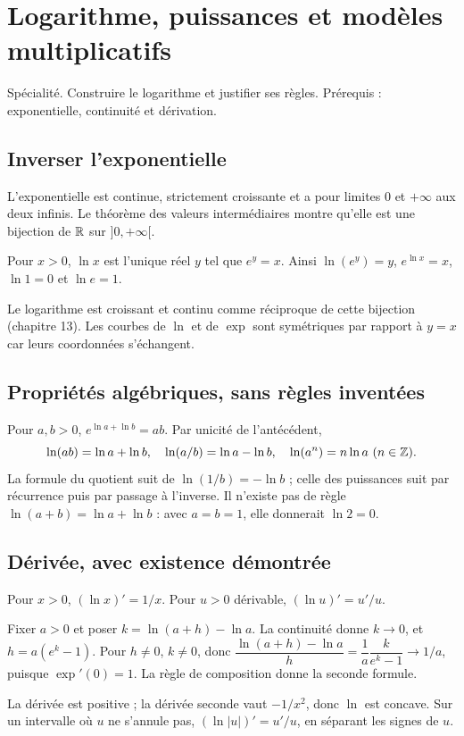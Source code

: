 \documentclass[../cours_tle.tex]{subfiles}
\begin{document}
\setcounter{chapter}{15}
\chapter{Logarithme, puissances et modèles multiplicatifs}
\label{ch:16}
\begin{objectif}
Spécialité. Construire le logarithme et justifier ses règles. Prérequis : exponentielle, continuité et dérivation.
\end{objectif}
\section{Inverser l'exponentielle}
L'exponentielle est continue, strictement croissante et a pour limites $0$ et $+\infty$ aux deux infinis. Le théorème des valeurs intermédiaires montre qu'elle est une bijection de $\mathbb{R}$ sur $]0,+\infty[$.
\begin{definition}
Pour $x>0$, $\ln x$ est l'unique réel $y$ tel que $e^y=x$.
Ainsi $\ln(e^y)=y$, $e^{\ln x}=x$, $\ln1=0$ et $\ln e=1$.
\end{definition}
Le logarithme est croissant et continu comme réciproque de cette bijection (chapitre 13). Les courbes de $\ln$ et de $\exp$ sont symétriques par rapport à $y=x$ car leurs coordonnées s'échangent.
\section{Propriétés algébriques, sans règles inventées}
Pour $a,b>0$, $e^{\ln a+\ln b}=ab$. Par unicité de l'antécédent,
\[
\ln(ab)=\ln a+\ln b,\quad \ln(a/b)=\ln a-\ln b,\quad \ln(a^n)=n\ln a\ (n\in\Z).
\]
La formule du quotient suit de $\ln(1/b)=-\ln b$ ; celle des puissances suit par récurrence puis par passage à l'inverse.
Il n'existe pas de règle $\ln(a+b)=\ln a+\ln b$ : avec $a=b=1$, elle donnerait $\ln2=0$.
\section{Dérivée, avec existence démontrée}
\begin{theoreme}
Pour $x>0$, $(\ln x)'=1/x$. Pour $u>0$ dérivable, $(\ln u)'=u'/u$.
\end{theoreme}
\begin{demonstration}
Fixer $a>0$ et poser $k=\ln(a+h)-\ln a$. La continuité donne $k\to0$, et $h=a(e^k-1)$. Pour $h\ne0$, $k\ne0$, donc
$\dfrac{\ln(a+h)-\ln a}{h}=\dfrac1a\dfrac{k}{e^k-1}\to1/a$, puisque $\exp'(0)=1$.
La règle de composition donne la seconde formule.
\end{demonstration}
La dérivée est positive ; la dérivée seconde vaut $-1/x^2$, donc $\ln$ est concave.
Sur un intervalle où $u$ ne s'annule pas, $(\ln|u|)'=u'/u$, en séparant les signes de $u$.
\end{document}

